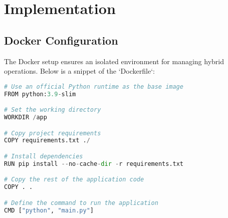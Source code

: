 \documentclass[12pt,a4paper]{article}
\begin{document}
\section{Implementation}
\subsection{Docker Configuration}
The Docker setup ensures an isolated environment for managing hybrid operations. Below is a snippet of the `Dockerfile`:

\begin{tcolorbox}[title=Dockerfile Example, colback=gray!5!white, colframe=blue!75!black]
\begin{lstlisting}[language=Python]
# Use an official Python runtime as the base image
FROM python:3.9-slim

# Set the working directory
WORKDIR /app

# Copy project requirements
COPY requirements.txt ./

# Install dependencies
RUN pip install --no-cache-dir -r requirements.txt

# Copy the rest of the application code
COPY . .

# Define the command to run the application
CMD ["python", "main.py"]
\end{lstlisting}
\end{tcolorbox}

\end{document}
